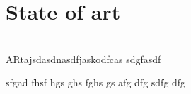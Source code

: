 
\chapter{State of art}
\\
ARtajsdasdnasdfjaskodfcas
sdgfasdf

sfgad
fhsf
hgs
ghs
fghs
gs
afg
dfg
sdfg
dfg